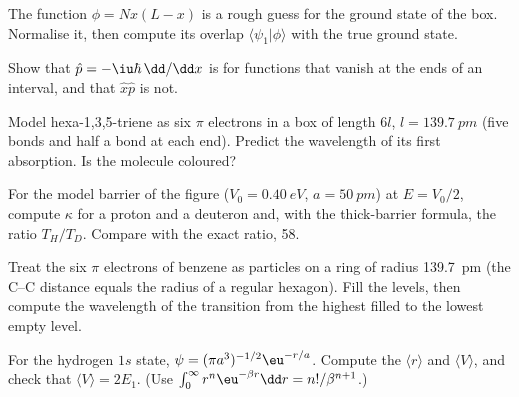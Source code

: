 \begin{exercise}[$\star\star$]\label{exo:b3:quantum-model-systems:7}
The function $\phi = Nx(L - x)$ is a rough guess for the ground state of the
box. Normalise it, then compute its overlap $\langle\psi_1|\phi\rangle$ with
the true ground state.
\end{exercise}

\begin{exercise}[$\star\star$]\label{exo:b3:quantum-model-systems:8}
Show that $\hat p = -\iu\hbar\,\dd/\dd x$ is  for functions that
vanish at the ends of an interval, and that $\hat x\hat p$ is not.
\end{exercise}

\begin{exercise}[$\star\star$]\label{exo:b3:quantum-model-systems:9}
Model hexa-1,3,5-triene as six $\pi$ electrons in a box of length $6l$, $l =
\qty{139.7}{pm}$ (five bonds and half a bond at each end). Predict the
wavelength of its first absorption. Is the molecule coloured?
\end{exercise}

\begin{exercise}[$\star\star\star$]\label{exo:b3:quantum-model-systems:10}
For the model barrier of the figure ($V_0 = \qty{0.40}{eV}$, $a = \qty{50}{pm}$)
at $E = V_0/2$, compute $\kappa$ for a proton and a deuteron and, with the
thick-barrier formula, the ratio $T_H/T_D$. Compare with the exact ratio, 58.
\end{exercise}

\begin{exercise}[$\star\star\star$]\label{exo:b3:quantum-model-systems:11}
Treat the six $\pi$ electrons of benzene as particles on a ring of radius
\qty{139.7}{pm} (the C--C distance equals the radius of a regular hexagon).
Fill the levels, then compute the wavelength of the transition from the
highest filled to the lowest empty level.
\end{exercise}

\begin{exercise}[$\star\star\star$]\label{exo:b3:quantum-model-systems:12}
For the hydrogen $1s$ state, $\psi = (\pi a^3)^{-1/2}\eu^{-r/a}$. Compute the
 $\langle r\rangle$ and $\langle V\rangle$, and check that
$\langle V\rangle = 2E_1$. (Use $\int_0^\infty r^n\eu^{-\beta r}\dd r =
n!/\beta^{n+1}$.)
\end{exercise}

